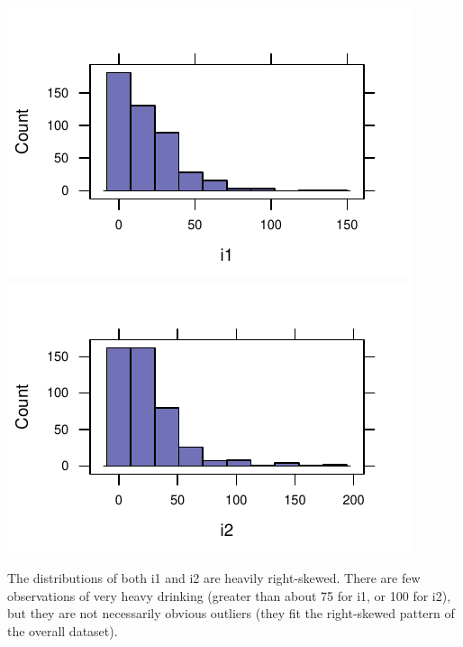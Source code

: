 \documentclass[twoside]{book}\usepackage[]{graphicx}\usepackage[]{xcolor}
\makeatletter
\def\maxwidth{ %
  \ifdim\Gin@nat@width>\linewidth
    \linewidth
  \else
    \Gin@nat@width
  \fi
}
\newenvironment{knitrout}{}{} %
\makeatother
\begin{document}
\begin{solution}
\begin{knitrout}
{\centering \includegraphics[width=\maxwidth]{figures/fig-unnamed-chunk-34-1} 
\includegraphics[width=\maxwidth]{figures/fig-unnamed-chunk-34-2} 

}



\end{knitrout}
The distributions of both i1 and i2 are heavily right-skewed. There are few observations of very heavy drinking (greater than about 75 for i1, or 100 for i2), but they are not necessarily obvious outliers (they fit the right-skewed pattern of the overall dataset).
\end{solution}
\end{document}
